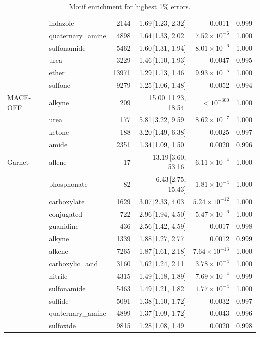 \begin{table}[t]
\begin{tabular}{llrrrr}
      & indazole & 2144 & 1.69\,[1.23, 2.32] & 0.0011 & 0.999 \\
      & quaternary\_amine & 4898 & 1.64\,[1.33, 2.02] & $7.52\times 10^{-6}$ & 1.000 \\
      & sulfonamide & 5462 & 1.60\,[1.31, 1.94] & $8.01\times 10^{-6}$ & 1.000 \\
      & urea & 3229 & 1.46\,[1.10, 1.93] & 0.0047 & 0.995 \\
      & ether & 13971 & 1.29\,[1.13, 1.46] & $9.93\times 10^{-5}$ & 1.000 \\
      & sulfone & 9279 & 1.25\,[1.06, 1.48] & 0.0052 & 0.994 \\
    \hline
    MACE-OFF & alkyne & 209 & 15.00\,[11.23, 18.54] & $< 10^{-300}$ & 1.000 \\
      & urea & 177 & 5.81\,[3.22, 9.59] & $8.62\times 10^{-7}$ & 1.000 \\
      & ketone & 188 & 3.20\,[1.49, 6.38] & 0.0025 & 0.997 \\
      & amide & 2351 & 1.34\,[1.09, 1.50] & 0.0020 & 0.996 \\
    \hline
    Garnet & allene & 17 & 13.19\,[3.60, 53.16] & $6.11\times 10^{-4}$ & 1.000 \\
      & phosphonate & 82 & 6.43\,[2.75, 15.43] & $1.81\times 10^{-4}$ & 1.000 \\
      & carboxylate & 1629 & 3.07\,[2.33, 4.03] & $5.24\times 10^{-12}$ & 1.000 \\
      & conjugated & 722 & 2.96\,[1.94, 4.50] & $5.47\times 10^{-6}$ & 1.000 \\
      & guanidine & 436 & 2.56\,[1.42, 4.59] & 0.0017 & 0.998 \\
      & alkyne & 1339 & 1.88\,[1.27, 2.77] & 0.0012 & 0.999 \\
      & alkene & 7265 & 1.87\,[1.61, 2.18] & $7.64\times 10^{-13}$ & 1.000 \\
      & carboxylic\_acid & 3160 & 1.62\,[1.24, 2.11] & $3.78\times 10^{-4}$ & 1.000 \\
      & nitrile & 4315 & 1.49\,[1.18, 1.89] & $7.69\times 10^{-4}$ & 0.999 \\
      & sulfonamide & 5463 & 1.49\,[1.21, 1.82] & $1.77\times 10^{-4}$ & 1.000 \\
      & sulfide & 5091 & 1.38\,[1.10, 1.72] & 0.0032 & 0.997 \\
      & quaternary\_amine & 4899 & 1.37\,[1.09, 1.72] & 0.0043 & 0.996 \\
      & sulfoxide & 9815 & 1.28\,[1.08, 1.49] & 0.0020 & 0.998 \\
    \hline
  \end{tabular}
  \caption{Motif enrichment for highest 1\% errors.}
  \label{tab:split_propers_worst}
\end{table}